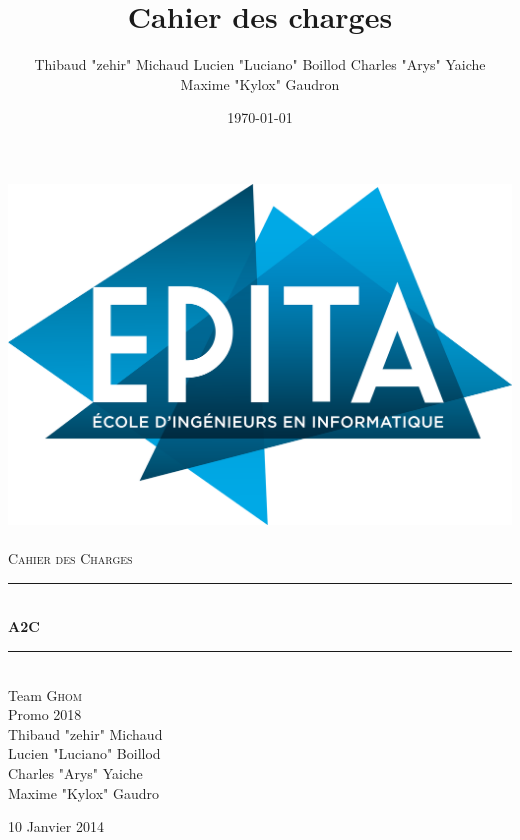\title{Cahier des charges}

\author{Thibaud "zehir" Michaud
		Lucien "Luciano" Boillod
        Charles "Arys" Yaiche
        Maxime "Kylox" Gaudron}

\date{\today}

\newcommand{\hsp}{\hspace{20pt}}
\newcommand{\HRule}{\rule{\linewidth}{0.5mm}}



\begin{titlepage}
  \begin{sffamily}
  \begin{center}

    \includegraphics[scale=0.04]{logo-epita.png}~\\[1.5cm]

    \textsc{Cahier des Charges}\\[1.5cm]

    \HRule \\[0.4cm]
    { \huge \bfseries A2C\\[0.4cm] }
    \HRule \\[1cm]

       {Team \textsc{Ghom}\\
        Promo 2018}\\[1.5cm]

        Thibaud "zehir" Michaud\\
	Lucien "Luciano" Boillod\\
        Charles "Arys" Yaiche\\
        Maxime "Kylox" Gaudro

    \vfill
	{\large 10 Janvier 2014}

  \end{center}
  \end{sffamily}
\end{titlepage}
